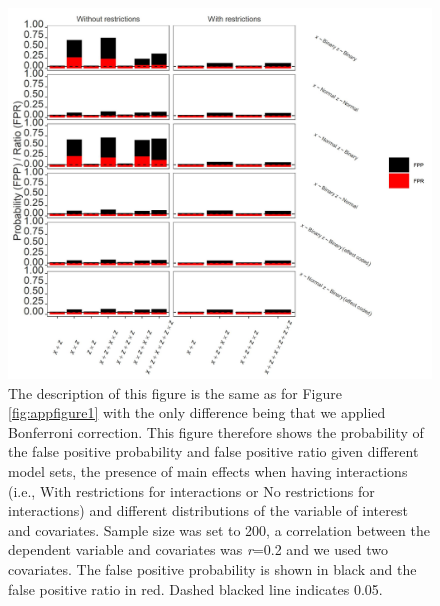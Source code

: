 \begin{figure}[hbt!]
\includegraphics[scale=0.95]{R/Analysis/Result/Figures/Figure1ASIBon.jpeg}
\centering
\caption{The description of this figure is the same as for Figure \ref{fig:appfigure1} with the only difference being that we applied Bonferroni correction. This figure therefore shows the probability of the false positive probability and false positive ratio given different model sets, the presence of main effects when having interactions (i.e., With restrictions for interactions or No restrictions for interactions) and different distributions of the variable of interest and covariates. Sample size was set to 200, a correlation between the dependent variable and covariates was \textit{r}=0.2 and we used two covariates. The false positive probability is shown in black and the false positive ratio in red. Dashed blacked line indicates 0.05. }
\label{fig:appfigure7}
\end{figure}

\begin{landscape}

\end{landscape}


